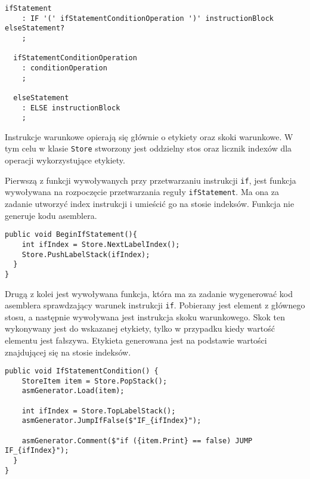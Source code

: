 \begin{lstlisting}[language=IL, caption={Gramatyka dla instrukcji \texttt{if}}, label=alg:if1]
  ifStatement
    : IF '(' ifStatementConditionOperation ')' instructionBlock elseStatement?
    ;

  ifStatementConditionOperation
    : conditionOperation
    ;

  elseStatement
    : ELSE instructionBlock
    ;
\end{lstlisting}

\par Instrukcje warunkowe opierają się głównie o etykiety oraz skoki warunkowe. W tym celu w klasie \texttt{Store} stworzony jest oddzielny stos oraz licznik indexów dla operacji wykorzystujące etykiety. 

\par Pierwszą z funkcji wywoływanych przy przetwarzaniu instrukcji \texttt{if}, jest funkcja wywoływana na rozpoczęcie przetwarzania reguły \texttt{ifStatement}. Ma ona za zadanie utworzyć index instrukcji i umieścić go na stosie indeksów. Funkcja nie generuje kodu asemblera.

\begin{lstlisting}[language=CSharp, caption={Implementacja funkcji wywoływanej przy rozpoczęciu analizy instrukcji \texttt{if}}, label=alg:if2]
  public void BeginIfStatement(){
    int ifIndex = Store.NextLabelIndex();
    Store.PushLabelStack(ifIndex);
  }
}
\end{lstlisting}

\par Drugą z kolei jest wywoływana funkcja, która ma za zadanie wygenerować kod asemblera sprawdzający warunek instrukcji \texttt{if}. Pobierany jest element z głównego stosu, a następnie wywoływana jest instrukcja skoku warunkowego. Skok ten wykonywany jest do wskazanej etykiety, tylko w przypadku kiedy wartość elementu jest fałszywa. Etykieta generowana jest na podstawie wartości znajdującej się na stosie indeksów.

\begin{lstlisting}[language=CSharp, caption={Implementacja funkcji obsługująca warunek instrukcji \texttt{if}}, label=alg:if3]
  public void IfStatementCondition() {
    StoreItem item = Store.PopStack();
    asmGenerator.Load(item);

    int ifIndex = Store.TopLabelStack();
    asmGenerator.JumpIfFalse($"IF_{ifIndex}");

    asmGenerator.Comment($"if ({item.Print} == false) JUMP IF_{ifIndex}");
  }
}
\end{lstlisting}

